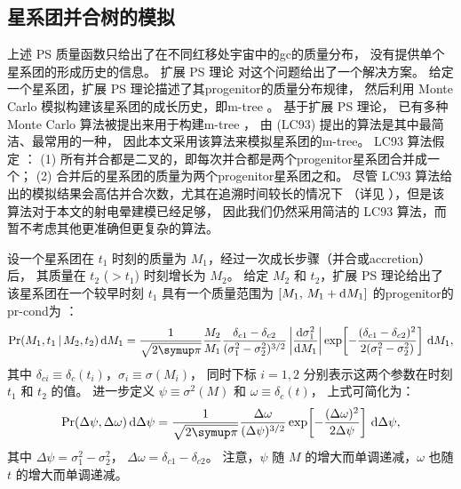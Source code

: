 \subsection{星系团并合树的模拟}
\label{sec:merging-history}

上述 \ac{PS} 质量函数只给出了在不同红移处宇宙中的\ac{gc}的质量分布，
没有提供单个星系团的形成历史的信息。
扩展 \ac{PS} 理论 \cite{bond1991,lacey1993} 对这个问题给出了一个解决方案。
给定一个星系团，扩展 \ac{PS} 理论描述了其\ac{progenitor}的质量分布规律，
然后利用 Monte Carlo 模拟构建该星系团的成长历史，即\acf{m-tree}
\cite{lacey1993,randall2002,zhang2008,zentner2007}。
基于扩展 \ac{PS} 理论，
已有多种 Monte Carlo 算法被提出来用于构建\ac{m-tree} \cite{zhang2008}，
由  (LC93) 提出的算法是其中最简洁、最常用的一种，
因此本文采用该算法来模拟星系团的\ac{m-tree}。
LC93 算法假定 \cite{lacey1993}：
(1) 所有并合都是二叉的，即每次并合都是两个\ac{progenitor}星系团合并成一个；
(2) 合并后的星系团的质量为两个\ac{progenitor}星系团之和。
尽管 LC93 算法给出的模拟结果会高估并合次数，尤其在追溯时间较长的情况下
（详见 ），但是该算法对于本文的射电晕建模已经足够，
因此我们仍然采用简洁的 LC93 算法，而暂不考虑其他更准确但更复杂的算法。

设一个星系团在 $t_1$ 时刻的质量为 $M_1$，经过一次成长步骤（并合或\ac{accretion}）后，
其质量在 $t_2$ ($> t_1$) 时刻增长为 $M_2$。
给定 $M_2$ 和 $t_2$，扩展 \ac{PS} 理论给出了该星系团在一个较早时刻 $t_1$
具有一个质量范围为 $[M_1,\, M_1+\mathrm{d}M_1]$ 的\ac{progenitor}的\ac{pr-cond}为
\cite{lacey1993,randall2002}：
\begin{equation}
  \label{eq:eps-condprob}
  \R{Pr}(M_1, t_1 \,|\, M_2, t_2) \,\D{M_1} =
    \frac{1}{\sqrt{2\Cpi}} \frac{M_2}{M_1}
    \frac{\delta_{c1} - \delta_{c2}}{(\sigma_1^2 - \sigma_2^2)^{3/2}}
    \left| \diff{\sigma_1^2}{M_1} \right|
    \exp \!\left[ -\frac{(\delta_{c1} - \delta_{c2})^2}
      {2(\sigma_1^2 - \sigma_2^2)} \right] \,\D{M_1} ,
\end{equation}
其中
$\delta_{ci} \equiv \delta_c(t_i)$，$\sigma_i \equiv \sigma(M_i)$，
同时下标 $i = 1, 2$ 分别表示这两个参数在时刻 $t_1$ 和 $t_2$ 的值。
进一步定义 $\psi \equiv \sigma^2(M)$ 和 $\omega \equiv \delta_c(t)$，
上式可简化为：
\begin{equation}
  \label{eq:eps-condprob2}
  \R{Pr}(\Delta\psi, \Delta\omega) \,\D{\Delta\psi} =
    \frac{1}{\sqrt{2\Cpi}} \frac{\Delta\omega}{(\Delta\psi)^{3/2}}
    \exp \!\left[ -\frac{(\Delta\omega)^2}{2 \Delta\psi} \right]
    \,\D{\Delta\psi} ,
\end{equation}
其中
$\Delta\psi = \sigma_1^2 - \sigma_2^2$，
$\Delta\omega = \delta_{c1} - \delta_{c2}$。
注意，$\psi$ 随 $M$ 的增大而单调递减，$\omega$ 也随 $t$ 的增大而单调递减。

